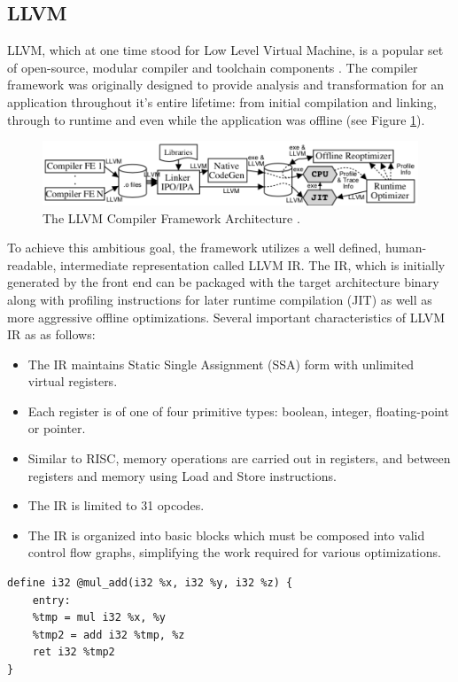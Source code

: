 \subsection{LLVM}
\label{sec:llvm}
LLVM, which at one time stood for Low Level Virtual Machine, is a popular set of open-source, modular compiler and toolchain components \cite{lattner2004llvm}.
The compiler framework was originally designed to provide analysis and transformation for an application throughout it's entire lifetime: from initial compilation and linking, through to runtime and even while the application was offline (see Figure \ref{fig:llvmarch}).
\begin{figure}
    \includegraphics[width=\textwidth]{images/llvm-architecture.png}
    \caption{ The LLVM Compiler Framework Architecture \cite{lattner2004llvm}.}
    \label{fig:llvmarch}
    \Description[]{}
\end{figure}
To achieve this ambitious goal, the framework utilizes a well defined, human-readable, intermediate representation called LLVM IR.
The IR, which is initially generated by the front end can be packaged with the target architecture binary along with profiling instructions for later runtime compilation (JIT) as well as more aggressive offline optimizations.
Several important characteristics of LLVM IR as as follows:
\begin{itemize}
    \item The IR maintains Static Single Assignment (SSA) form with unlimited virtual registers.
    \item Each register is of one of four primitive types: boolean, integer, floating-point or pointer.
    \item Similar to RISC, memory operations are carried out in registers, and between registers and memory using Load and Store instructions.
    \item The IR is limited to 31 opcodes.
    \item The IR is organized into basic blocks which must be composed into valid control flow graphs, simplifying the work required for various optimizations. 
\end{itemize}

\begin{lstlisting}[float,floatplacement=H,
caption={LLVM IR for a function multiplying x * y and adding z \cite{LLVM_Jit_Tutorial}},
label=lst:llvm_ir]
define i32 @mul_add(i32 %x, i32 %y, i32 %z) {
    entry:
    %tmp = mul i32 %x, %y
    %tmp2 = add i32 %tmp, %z
    ret i32 %tmp2
}\end{lstlisting}

